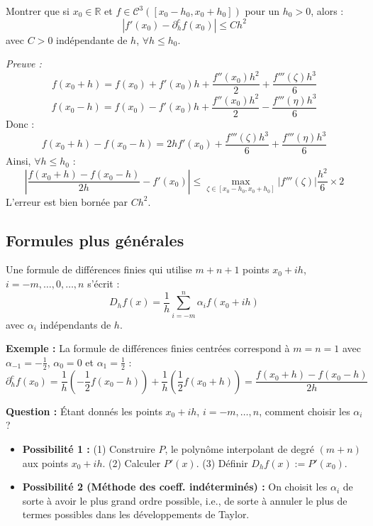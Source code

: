 \begin{proposition}
Montrer que si $x_0 \in \mathbb{R}$ et $f \in \mathcal{C}^3([x_0-h_0, x_0+h_0])$ pour un $h_0 > 0$, alors :
$$|f'(x_0) - \partial_h^c f(x_0)| \le Ch^2$$
avec $C > 0$ indépendante de $h$, $\forall h \le h_0$.
\end{proposition}
\textit{Preuve :}
$$f(x_0+h) = f(x_0) + f'(x_0)h + \frac{f''(x_0)h^2}{2} + \frac{f'''(\zeta)h^3}{6}$$
$$f(x_0-h) = f(x_0) - f'(x_0)h + \frac{f''(x_0)h^2}{2} - \frac{f'''(\eta)h^3}{6}$$
Donc :
$$f(x_0+h) - f(x_0-h) = 2h f'(x_0) + \frac{f'''(\zeta)h^3}{6} + \frac{f'''(\eta)h^3}{6}$$
Ainsi, $\forall h \le h_0$ :
$$\left| \frac{f(x_0+h)-f(x_0-h)}{2h} - f'(x_0) \right| \le \max_{\zeta \in [x_0-h_0, x_0+h_0]} |f'''(\zeta)| \frac{h^2}{6} \times 2$$
L'erreur est bien bornée par $Ch^2$.

\subsection{Formules plus générales}

\begin{definition}
Une formule de différences finies qui utilise $m+n+1$ points $x_0+ih$, $i=-m, \dots, 0, \dots, n$ s'écrit :
$$D_h f(x) = \frac{1}{h} \sum_{i=-m}^n \alpha_i f(x_0+ih)$$
avec $\alpha_i$ indépendants de $h$.
\end{definition}

\textbf{Exemple :} La formule de différences finies centrées correspond à $m=n=1$ avec $\alpha_{-1}=-\frac{1}{2}$, $\alpha_0=0$ et $\alpha_1=\frac{1}{2}$ :
$$\partial_h^c f(x_0) = \frac{1}{h}\left(-\frac{1}{2}f(x_0-h)\right) + \frac{1}{h}\left(\frac{1}{2}f(x_0+h)\right) = \frac{f(x_0+h)-f(x_0-h)}{2h}$$

\textbf{Question :} Étant donnés les points $x_0+ih$, $i=-m, \dots, n$, comment choisir les $\alpha_i$ ?
\begin{itemize}
    \item \textbf{Possibilité 1 :} (1) Construire $P$, le polynôme interpolant de degré $(m+n)$ aux points $x_0+ih$. (2) Calculer $P'(x)$. (3) Définir $D_h f(x) := P'(x_0)$.
    \item \textbf{Possibilité 2 (Méthode des coeff. indéterminés) :} On choisit les $\alpha_i$ de sorte à avoir le plus grand ordre possible, i.e., de sorte à annuler le plus de termes possibles dans les développements de Taylor.
\end{itemize}

